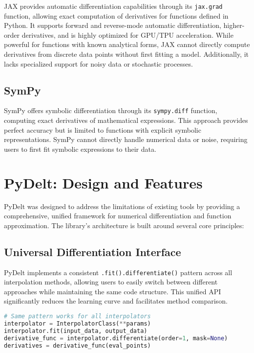 \documentclass[11pt,a4paper]{article}
\begin{document}
JAX \citep{jax2018github} provides automatic differentiation capabilities through its \texttt{jax.grad} function, allowing exact computation of derivatives for functions defined in Python. It supports forward and reverse-mode automatic differentiation, higher-order derivatives, and is highly optimized for GPU/TPU acceleration. While powerful for functions with known analytical forms, JAX cannot directly compute derivatives from discrete data points without first fitting a model. Additionally, it lacks specialized support for noisy data or stochastic processes.

\subsection{SymPy}

SymPy \citep{sympy2017} offers symbolic differentiation through its \texttt{sympy.diff} function, computing exact derivatives of mathematical expressions. This approach provides perfect accuracy but is limited to functions with explicit symbolic representations. SymPy cannot directly handle numerical data or noise, requiring users to first fit symbolic expressions to their data.

\section{PyDelt: Design and Features}

PyDelt was designed to address the limitations of existing tools by providing a comprehensive, unified framework for numerical differentiation and function approximation. The library's architecture is built around several core principles:

\subsection{Universal Differentiation Interface}

PyDelt implements a consistent \texttt{.fit().differentiate()} pattern across all interpolation methods, allowing users to easily switch between different approaches while maintaining the same code structure. This unified API significantly reduces the learning curve and facilitates method comparison.

\begin{lstlisting}[language=Python, caption=Universal differentiation interface example]
# Same pattern works for all interpolators
interpolator = InterpolatorClass(**params)
interpolator.fit(input_data, output_data)
derivative_func = interpolator.differentiate(order=1, mask=None)
derivatives = derivative_func(eval_points)
\end{lstlisting}
\end{document}
